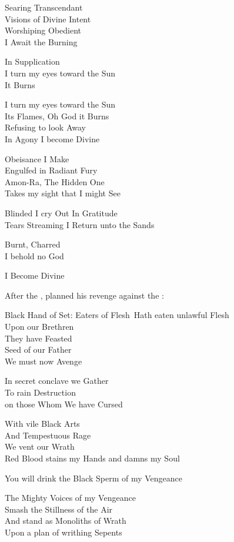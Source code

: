   Searing Transcendant\\
  Visions of Divine Intent\\
  Worshiping Obedient\\
  I Await the Burning

  In Supplication\\
  I turn my eyes toward the Sun\\
  It Burns

  I turn my eyes toward the Sun\\
  Its Flames, Oh God it Burns\\
  Refusing to look Away\\
  In Agony I become Divine

  Obeisance I Make\\
  Engulfed in Radiant Fury\\
  Amon-Ra, The Hidden One\\
  Takes my sight that I might See

  Blinded I cry Out In Gratitude\\
  Tears Streaming I Return unto the Sands

  Burnt, Charred\\
  I behold no God

  I Become Divine



After the \secondbanewar, \Secherdamon planned his revenge against the \resphain:

Black Hand of Set:
  Eaters of \human Flesh\
  Hath eaten unlawful Flesh\\
  Upon our Brethren\\
  They have Feasted\\
  Seed of our Father\\
  We must now Avenge

  In secret conclave we Gather\\
  To rain Destruction \\
  on those Whom We have Cursed

  With vile Black Arts\\
  And Tempestuous Rage\\
  We vent our Wrath\\
  Red Blood stains my Hands and damns my Soul

  You will drink the Black Sperm of my Vengeance

  The Mighty Voices of my Vengeance\\
  Smash the Stillness of the Air\\
  And stand as Monoliths of Wrath\\
  Upon a plan of writhing Sepents

